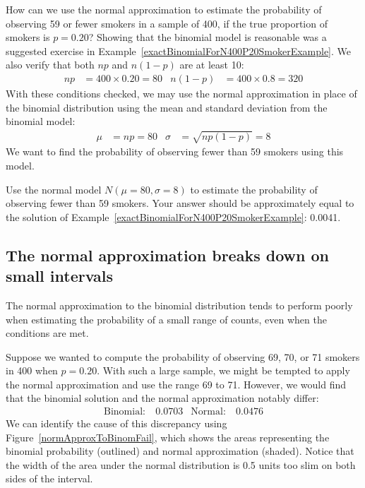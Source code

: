 \begin{examplewrap}
\begin{nexample}{How can we use the normal approximation to estimate the probability of observing 59 or fewer smokers in a sample of 400, if the true proportion of smokers is $p=0.20$?} \label{approxBinomialForN400P20SmokerExample}
Showing that the binomial model is reasonable was a suggested exercise in Example~\ref{exactBinomialForN400P20SmokerExample}. We also verify that both $np$ and $n(1-p)$ are at least 10:
\begin{align*}
np&=400\times 0.20=80
&n(1-p)&=400\times 0.8=320
\end{align*}
With these conditions checked, we may use the normal approximation in place of the binomial distribution using the mean and standard deviation from the binomial model:
\begin{align*}
\mu &= np = 80
&\sigma &= \sqrt{np(1-p)} = 8
\end{align*}
We want to find the probability of observing fewer than 59 smokers using this model.
\end{nexample}
\end{examplewrap}

\begin{exercisewrap}
\begin{nexercise}
Use the normal model $N(\mu=80, \sigma=8)$ to estimate the probability of observing fewer than 59 smokers. Your answer should be approximately equal to the solution of Example~\ref{exactBinomialForN400P20SmokerExample}: 0.0041.\footnotemark
\end{nexercise}
\end{exercisewrap}


\subsection{The normal approximation breaks down on small intervals}

The normal approximation to the binomial distribution tends to perform poorly when estimating the probability of a small range of counts, even when the conditions are met.

Suppose we wanted to compute the probability of observing 69, 70, or 71 smokers in 400 when $p=0.20$. With such a large sample, we might be tempted to apply the normal approximation and use the range 69 to 71. However, we would find that the binomial solution and the normal approximation notably differ:
\begin{align*}
\text{Binomial:}&\ 0.0703
&\text{Normal:}&\ 0.0476
\end{align*}
We can identify the cause of this discrepancy using Figure~\ref{normApproxToBinomFail}, which shows the areas representing the binomial probability (outlined) and normal approximation (shaded). Notice that the width of the area under the normal distribution is 0.5 units too slim on both sides of the interval.

